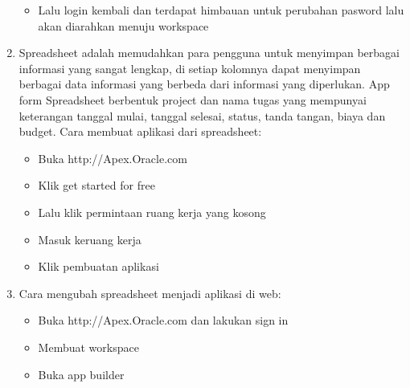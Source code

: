 \begin{enumerate}
	\begin{itemize}
	\item Lalu login kembali dan terdapat himbauan untuk perubahan pasword lalu akan diarahkan menuju workspace
	\end{itemize} 	
	
	\item Spreadsheet adalah memudahkan para pengguna untuk menyimpan berbagai informasi yang sangat lengkap, di setiap kolomnya dapat menyimpan berbagai data informasi yang berbeda dari informasi yang diperlukan. App form Spreadsheet berbentuk project dan nama tugas yang mempunyai keterangan tanggal mulai, tanggal selesai, status, tanda tangan, biaya dan budget.  Cara membuat aplikasi dari spreadsheet:
	\begin{itemize}
	\item Buka http://Apex.Oracle.com
	\end{itemize}
	 
	\begin{itemize}
	\item Klik get started for free
	\end{itemize}
		 
	\begin{itemize}
	\item Lalu klik permintaan ruang kerja yang kosong
	\end{itemize}
	 
	\begin{itemize}
	\item Masuk keruang kerja
	\end{itemize}
	 
	\begin{itemize}
	\item Klik pembuatan aplikasi
	\end{itemize} 
	
	\item Cara mengubah spreadsheet menjadi aplikasi di web:
	\begin{itemize} 
	\item Buka http://Apex.Oracle.com dan lakukan sign in
	\end{itemize}
	
	\begin{itemize}
	\item Membuat workspace
	\end{itemize}
	 
	\begin{itemize}
	\item Buka app builder
	\end{itemize}
	 

\end{enumerate}
